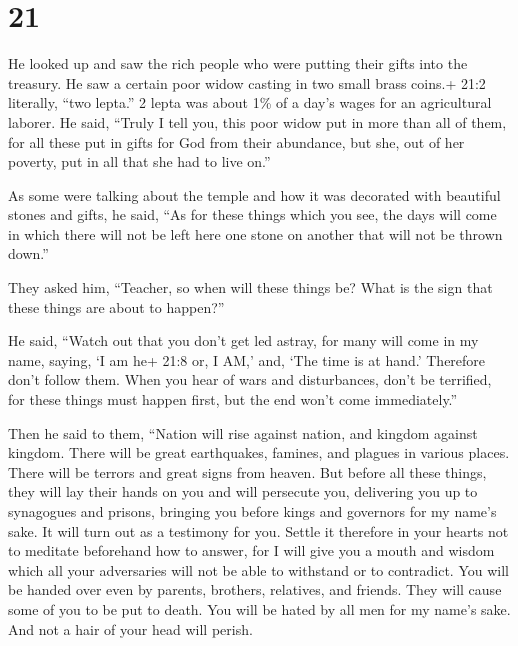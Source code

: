 \hypertarget{section-20}{%
\section{21}\label{section-20}}

 He looked up and saw the rich people who were putting their
gifts into the treasury.  He saw a certain poor widow
casting in two small brass coins.+ 21:2 literally, ``two lepta.'' 2
lepta was about 1\% of a day's wages for an agricultural laborer.
 He said, ``Truly I tell you, this poor widow put in more
than all of them,  for all these put in gifts for God from
their abundance, but she, out of her poverty, put in all that she had to
live on.''

 As some were talking about the temple and how it was
decorated with beautiful stones and gifts, he said,  ``As
for these things which you see, the days will come in which there will
not be left here one stone on another that will not be thrown down.''

 They asked him, ``Teacher, so when will these things be?
What is the sign that these things are about to happen?''

 He said, ``Watch out that you don't get led astray, for
many will come in my name, saying, `I am he+ 21:8 or, I AM,' and, `The
time is at hand.' Therefore don't follow them.  When you
hear of wars and disturbances, don't be terrified, for these things must
happen first, but the end won't come immediately.''

 Then he said to them, ``Nation will rise against nation,
and kingdom against kingdom.  There will be great
earthquakes, famines, and plagues in various places. There will be
terrors and great signs from heaven.  But before all these
things, they will lay their hands on you and will persecute you,
delivering you up to synagogues and prisons, bringing you before kings
and governors for my name's sake.  It will turn out as a
testimony for you.  Settle it therefore in your hearts not
to meditate beforehand how to answer,  for I will give you
a mouth and wisdom which all your adversaries will not be able to
withstand or to contradict.  You will be handed over even
by parents, brothers, relatives, and friends. They will cause some of
you to be put to death.  You will be hated by all men for
my name's sake.  And not a hair of your head will perish.

